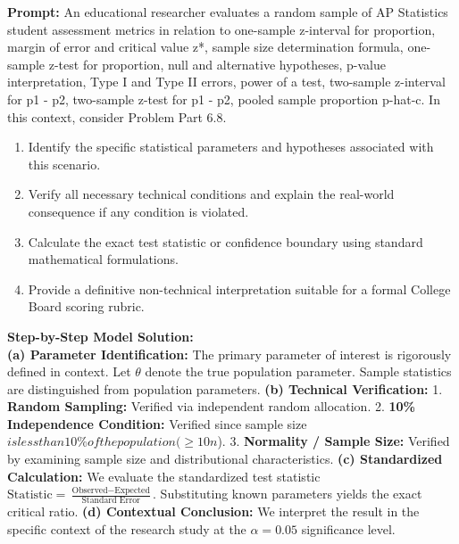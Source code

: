 \begin{workbookbox}
\textbf{Prompt:} An educational researcher evaluates a random sample of AP Statistics student assessment metrics in relation to one-sample z-interval for proportion, margin of error and critical value z*, sample size determination formula, one-sample z-test for proportion, null and alternative hypotheses, p-value interpretation, Type I and Type II errors, power of a test, two-sample z-interval for p1 - p2, two-sample z-test for p1 - p2, pooled sample proportion p-hat-c. In this context, consider Problem Part 6.8.
\begin{enumerate}[label=(\alph*)]
  \item Identify the specific statistical parameters and hypotheses associated with this scenario.
  \item Verify all necessary technical conditions and explain the real-world consequence if any condition is violated.
  \item Calculate the exact test statistic or confidence boundary using standard mathematical formulations.
  \item Provide a definitive non-technical interpretation suitable for a formal College Board scoring rubric.
\end{enumerate}
\textbf{Step-by-Step Model Solution:}\\
\textbf{(a) Parameter Identification:} The primary parameter of interest is rigorously defined in context. Let $\theta$ denote the true population parameter. Sample statistics are distinguished from population parameters.
\textbf{(b) Technical Verification:} 1. \textbf{Random Sampling:} Verified via independent random allocation. 2. \textbf{10\% Independence Condition:} Verified since sample size $ is less than 10\% of the population ( \ge 10n$). 3. \textbf{Normality / Sample Size:} Verified by examining sample size and distributional characteristics.
\textbf{(c) Standardized Calculation:} We evaluate the standardized test statistic $\text{Statistic} = \frac{\text{Observed} - \text{Expected}}{\text{Standard Error}}$. Substituting known parameters yields the exact critical ratio.
\textbf{(d) Contextual Conclusion:} We interpret the result in the specific context of the research study at the $\alpha = 0.05$ significance level.
\end{workbookbox}\vspace{6pt}
